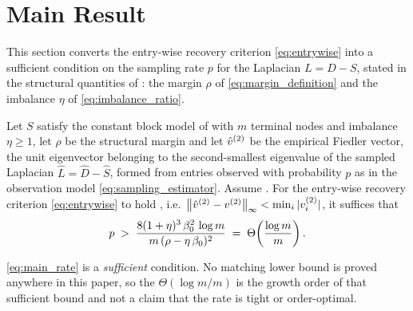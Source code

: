 \section{Main Result}\label{sec:main}
This section converts the entry-wise recovery criterion \eqref{eq:entrywise} into a
sufficient condition on the sampling rate $p$ for the Laplacian $L=D-S$, stated in the
structural quantities of : the
margin $\rho$ of \eqref{eq:margin_definition} and the imbalance $\eta$ of
\eqref{eq:imbalance_ratio}.

\begin{theorem}\label{thm:main-sim}
Let $S$ satisfy the constant block model of  with $m$ terminal nodes and
imbalance $\eta\ge1$, let $\rho$
be the structural margin and let $\hat v^{(2)}$ be the empirical Fiedler vector, the
unit eigenvector belonging to the second-smallest eigenvalue of the sampled
Laplacian $\hat L=\hat D-\hat S$, formed from entries observed with probability
$p$ as in the observation model \eqref{eq:sampling_estimator}. Assume
. For the entry-wise recovery criterion
\eqref{eq:entrywise} to hold \hp, i.e.\
$\left\lVert \hat v^{(2)}-v^{(2)} \right\rVert_\infty<\min_i|v^{(2)}_i|$, it suffices that
\begin{equation}\label{eq:main_rate}
   p\;>\;\frac{8(1+\eta)^3\,\beta_0^2\,\log m}{m\,(\rho-\eta\,\beta_0)^2}
       \;=\;\Theta\!\left(\frac{\log m}{m}\right).
\end{equation}
\end{theorem}

\noindent \eqref{eq:main_rate} is a \emph{sufficient} condition. No matching lower
bound is proved anywhere in this paper, so the $\Theta(\log m/m)$ is the growth
order of that sufficient bound and not a claim that the rate is tight or
order-optimal.

